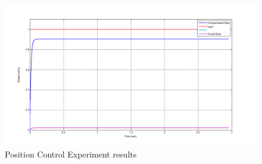 \begin{figure}[ht]
    \centering
    \includegraphics[width=.75\textwidth]{images/HW2speed.pdf}
    \caption{Position Control Experiment results}
    \label{fig:positionctrl}
\end{figure}